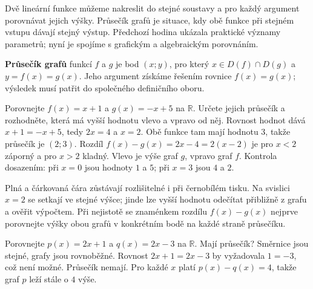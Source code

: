 \documentclass[11pt,a4paper]{article}
\begin{document}
Dvě lineární funkce můžeme nakreslit do stejné soustavy a pro každý argument porovnávat jejich výšky. Průsečík grafů je situace, kdy obě funkce při stejném vstupu dávají stejný výstup. Předchozí hodina ukázala praktické významy parametrů; nyní je spojíme s grafickým a algebraickým porovnáním.
\begin{definiceBox}[title={Definice - Průsečík grafů funkcí}]
\textbf{Průsečík grafů} funkcí $f$ a $g$ je bod $(x;y)$, pro který $x\in D(f)\cap D(g)$ a $y=f(x)=g(x)$. Jeho argument získáme řešením rovnice $f(x)=g(x)$; výsledek musí patřit do společného definičního oboru.
\end{definiceBox}
\begin{prikladReseniBox}[title={Příklad 1}]
Porovnejte $f(x)=x+1$ a $g(x)=-x+5$ na $\mathbb R$. Určete jejich průsečík a rozhodněte, která má vyšší hodnotu vlevo a vpravo od něj.
\tcblower
Rovnost hodnot dává $x+1=-x+5$, tedy $2x=4$ a $x=2$. Obě funkce tam mají hodnotu $3$, takže průsečík je $(2;3)$. Rozdíl $f(x)-g(x)=2x-4=2(x-2)$ je pro $x<2$ záporný a pro $x>2$ kladný. Vlevo je výše graf $g$, vpravo graf $f$. Kontrola dosazením: při $x=0$ jsou hodnoty $1$ a $5$; při $x=3$ jsou $4$ a $2$.
\end{prikladReseniBox}
\begin{center}
\end{center}
Plná a čárkovaná čára zůstávají rozlišitelné i při černobílém tisku. Na svislici $x=2$ se setkají ve stejné výšce; jinde lze vyšší hodnotu odečítat přibližně z grafu a ověřit výpočtem. Při nejistotě se znaménkem rozdílu $f(x)-g(x)$ nejprve porovnejte výšky obou grafů v konkrétním bodě na každé straně průsečíku.
\begin{prikladReseniBox}[title={Příklad 2}]
Porovnejte $p(x)=2x+1$ a $q(x)=2x-3$ na $\mathbb R$. Mají průsečík?
\tcblower
Směrnice jsou stejné, grafy jsou rovnoběžné. Rovnost $2x+1=2x-3$ by vyžadovala $1=-3$, což není možné. Průsečík nemají. Pro každé $x$ platí $p(x)-q(x)=4$, takže graf $p$ leží stále o $4$ výše.
\end{prikladReseniBox}
\end{document}

